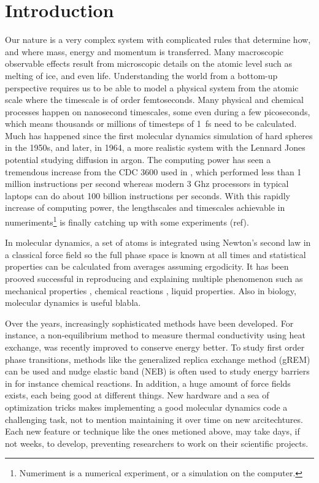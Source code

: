 \documentclass[aps,pre,twocolumn,letterpaper,floatfix,nofootinbib]{revtex4}
\begin{document}
\section{Introduction}
Our nature is a very complex system with complicated rules that determine how, and where mass, energy and momentum is transferred.
Many macroscopic observable effects result from microscopic details on the atomic level such as melting of ice, and even life.
Understanding the world from a bottom-up perspective requires us to be able to model a physical system from the atomic scale where the timescale is of order femtoseconds.
Many physical and chemical processes happen on nanosecond timescales, some even during a few picoseconds, which means thousands or millions of timesteps of \SI{1}{\femto\second} need to be calculated.
Much has happened since the first molecular dynamics simulation of hard spheres in the 1950s\citep{alder1957phase,alder1959studies}, and later, in 1964, a more realistic system with the Lennard Jones potential studying diffusion in argon\citep{rahman1964correlations}.
The computing power has seen a tremendous increase from the CDC 3600 used in \citep{rahman1964correlations}, which performed less than 1 million instructions per second whereas modern 3 Ghz processors in typical laptops can do about 100 billion instructions per seconds.
With this rapidly increase of computing power, the lengthscales and timescales achievable in numeriments\footnote{Numeriment is a numerical experiment, or a simulation on the computer.} is finally catching up with some experiments (ref).

In molecular dynamics, a set of atoms is integrated using Newton's second law in a classical force field so the full phase space is known at all times and statistical properties can be calculated from averages assuming ergodicity.
It has been prooved successful in reproducing and explaining multiple phenomenon such as mechanical properties \citep{jiang2009young, campbell1999structural, ning2012mechanical}, chemical reactions \citep{van2001reaxff, brenner2002second}, liquid properties\citep{allen2017computer}.
Also in biology, molecular dynamics is useful blabla.

Over the years, increasingly sophisticated methods have been developed.
For instance, a non-equilibrium method to measure thermal conductivity using heat exchange, was recently improved\citep{wirnsberger2015enhanced} to conserve energy better.
To study first order phase transitions, methods like the generalized replica exchange method (gREM)\citep{kim2010generalized} can be used and nudge elastic band (NEB)\citep{henkelman2000climbing, henkelman2000improved} is often used to study energy barriers in for instance chemical reactions.
In addition, a huge amount of force fields exists, each being good at different things.
New hardware and a sea of optimization tricks makes implementing a good molecular dynamics code a challenging task, not to mention maintaining it over time on new arcitechtures.
Each new feature or technique like the ones metioned above, may take days, if not weeks, to develop, preventing researchers to work on their scientific projects.
\end{document}
